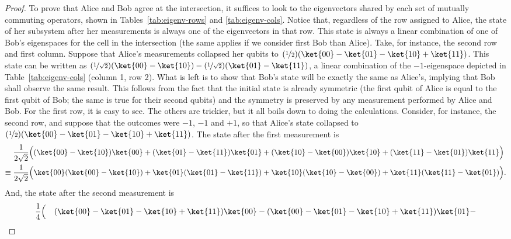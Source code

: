 \documentclass{llncs}
\begin{document}
\begin{proof}
  To prove that Alice and Bob agree at the intersection, it suffices
  to look to the eigenvectors shared by each set of mutually commuting
  operators, shown in Tables~\ref{tab:eigenv-rows} and
  \ref{tab:eigenv-cols}.  Notice that, regardless of the row assigned
  to Alice, the state of her subsystem after her measurements is
  always one of the eigenvectors in that row. This state is always a
  linear combination of one of Bob's eigenspaces for the cell in the
  intersection (the same applies if we consider first Bob than Alice).
  Take, for instance, the second row and first column. Suppose that
  Alice's measurements collapsed her qubits to
  \((\nicefrac{1}{2}) (\ket{00} - \ket{01} - \ket{10} + \ket{11})\).
  This state can be written as
  \((\nicefrac{1}{\sqrt{2}}) (\ket{00} - \ket{10}) -
  (\nicefrac{1}{\sqrt{2}}) (\ket{01} - \ket{11})\), a linear
  combination of the \(-1\)-eigenspace depicted in
  Table~\ref{tab:eigenv-cols} (column 1, row 2).  What is left is to
  show that Bob's state will be exactly the same as Alice's, implying
  that Bob shall observe the same result. This follows from the fact
  that the initial state is already symmetric (the first qubit of
  Alice is equal to the first qubit of Bob; the same is true for their
  second qubits) and the symmetry is preserved by any measurement
  performed by Alice and Bob. For the first row, it is easy to see.
  The others are trickier, but it all boils down to doing the
  calculations.  Consider, for instance, the second row, and suppose
  that the outcomes were \(-1\), \(-1\) and \(+1\), so that Alice's
  state collapsed to
  \((\nicefrac{1}{2}) (\ket{00} - \ket{01} - \ket{10} +
  \ket{11})\). The state after the first measurement is
  \begin{align}
    &\frac{1}{2\sqrt{2}} \Bigl(
    (\ket{00} - \ket{10}) \ket{00} +
    (\ket{01} - \ket{11}) \ket{01} +
    (\ket{10} - \ket{00}) \ket{10} +
    (\ket{11} - \ket{01}) \ket{11}
    \Bigr) \nonumber \\
    \equiv\;
    & \frac{1}{2\sqrt{2}} \Bigl(
      \ket{00} (\ket{00} - \ket{10}) +
      \ket{01} (\ket{01} - \ket{11}) +
      \ket{10} (\ket{10} - \ket{00}) +
      \ket{11} (\ket{11} - \ket{01})
    \Bigr).
  \end{align}
  And, the state after the second measurement is
  \begin{alignat}{2}
    &\frac{1}{4} \Bigl(
      &&(\ket{00} - \ket{01} - \ket{10} + \ket{11}) \ket{00} -
        (\ket{00} - \ket{01} - \ket{10} + \ket{11}) \ket{01} - \nonumber \\

\end{alignat}
\end{proof}
\end{document}
